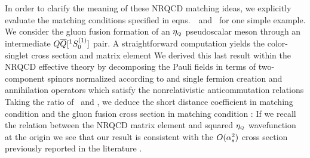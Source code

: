 	In order to clarify the meaning of these NRQCD matching ideas, we 
explicitly evaluate the matching conditions specified in eqns.~\matchI\ and 
\matchII\ for one simple example.   We consider the gluon fusion formation of 
an $\eta_{\scriptscriptstyle Q}$ pseudoscalar meson through an intermediate $Q{\overline Q}[ ^1S_0^{(1)}]$ 
pair.  A straightforward computation yields the color-singlet cross section 
%
\eqn{}
%
and matrix element 
%
\eqn{}
%
We derived this last result within the NRQCD effective theory by decomposing 
the Pauli fields
%
\eqn{}
%
in terms of two-component spinors normalized according 
to 
%
\eqn{}
%
and single fermion creation and annihilation operators which satisfy 
the nonrelativistic anticommutation relations
%
\eqn{}
%
Taking the ratio of \etaxsect\ and \oneSzeroME, we deduce the short distance 
coefficient in matching condition \matchI
%
\eqn{}
%
and the gluon fusion cross section in matching condition \matchII:
%
\eqn{}
%
If we recall the relation between the NRQCD matrix element and squared 
$\eta_{\scriptscriptstyle Q}$ wavefunction at the origin \Bodwin
%
\eqn{}
%
we see that our result is consistent with the $O(\alpha_s^2)$ cross section 
%
\eqn{}
%
previously reported in the literature \Baier.  

